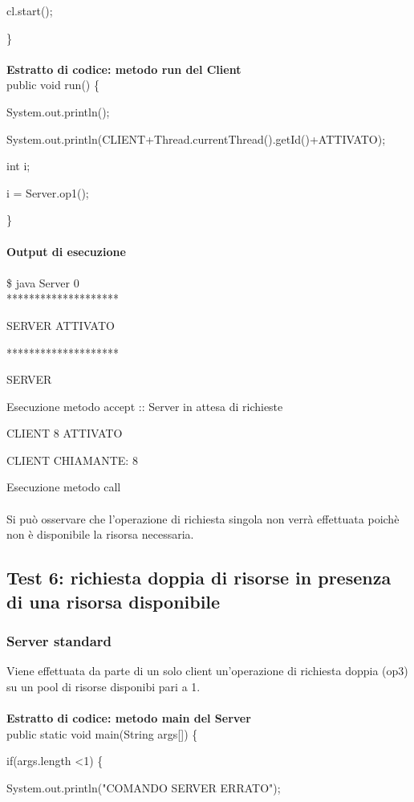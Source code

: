 \documentclass[10pt, a4paper]{article}
\begin{document}
	cl.start();

\}
\\\\
\textbf{Estratto di codice: metodo run del Client}
\\

public void run() \{

		System.out.println();

        	System.out.println(CLIENT+Thread.currentThread().getId()+ATTIVATO);

		int i;

		i = Server.op1();

\}
\\\\
\textbf{Output di esecuzione}
\\\\
\$ java Server 0
\\

********************

SERVER ATTIVATO

********************

SERVER

Esecuzione metodo accept :: Server in attesa di richieste

CLIENT 8 ATTIVATO

CLIENT CHIAMANTE: 8

Esecuzione metodo call
\\\\
Si può osservare che l'operazione di richiesta singola non verrà effettuata poichè non è disponibile la risorsa necessaria.
\subsection{Test 6: richiesta doppia di risorse in presenza di una risorsa disponibile}
\subsubsection{Server standard}
Viene effettuata da parte di un solo client un'operazione di richiesta doppia (op3) su un pool di risorse disponibi pari a 1.
\\\\
\textbf{Estratto di codice: metodo main del Server}
\\

public static void main(String args[]) \{

        if(args.length \textless 1) \{

            System.out.println("COMANDO SERVER ERRATO");
\end{document}
